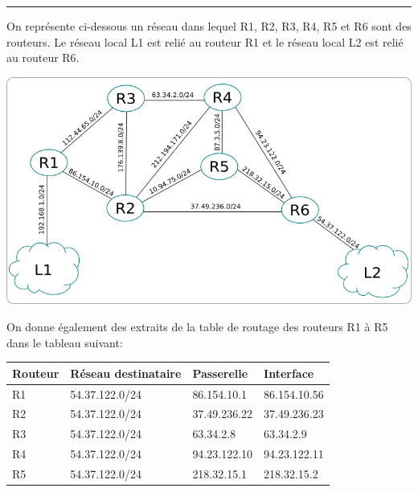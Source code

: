 \documentclass[11pt,a4paper]{article}
\newenvironment{head}[1]
{
	\setlength{\fboxsep}{-0.5cm}\setlength{\fboxrule}{0pt} 
	\framebox[18cm]{
		\begin{Huge}
			\textbf{#1}\hfill
		\end{Huge}			  
	}
}
{\newline \rule{\linewidth}{1pt}}
\begin{document}
\begin{head}
{Exercice}
\end{head}

\medskip
On représente ci-dessous un réseau dans lequel R1, R2, R3, R4, R5 et R6 sont des routeurs. Le réseau local L1 est relié au routeur R1 et le réseau local L2 est relié au routeur R6.

\begin{center}
\includegraphics[scale=0.8]{../img/21_NSIJ1ME5_ex5.png}
\end{center}

On donne également des extraits de la table de routage des routeurs R1 à R5 dans le tableau suivant:

\begin{center}
\begin{tabular}{*{4}{|C{3.6cm}}|}\hline
Routeur & Réseau destinataire & Passerelle & Interface\\ \hline
R1 & 54.37.122.0/24 & 86.154.10.1 & 86.154.10.56\\ \hline
R2 & 54.37.122.0/24 & 37.49.236.22 & 37.49.236.23\\ \hline
R3 & 54.37.122.0/24 & 63.34.2.8 & 63.34.2.9\\ \hline
R4 & 54.37.122.0/24 & 94.23.122.10 & 94.23.122.11\\ \hline
R5 & 54.37.122.0/24 & 218.32.15.1 & 218.32.15.2\\ \hline
\end{tabular}
\end{center}
\end{document}
